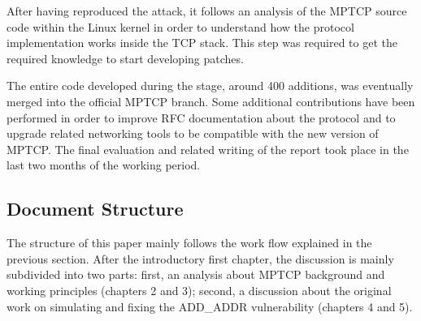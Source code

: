 After having reproduced the attack, it follows an analysis of the MPTCP source code within the Linux kernel in order to understand how the protocol implementation works inside the TCP stack. This step was required to get the required knowledge to start developing patches.


The entire code developed during the stage, around 400 additions, was eventually merged into the official MPTCP branch. Some additional contributions have been performed in order to improve RFC documentation about the protocol and to upgrade related networking tools to be compatible with the new version of MPTCP.
The final evaluation and related writing of the report took place in the last two months of the working period.

\subsection{Document Structure}
The structure of this paper mainly follows the work flow explained in the previous section. After the introductory first chapter, the discussion is mainly subdivided into two parts: first, an analysis about MPTCP background and working principles (chapters 2 and 3); second, a discussion about the original work on simulating and fixing the ADD\_ADDR vulnerability (chapters 4 and 5).

